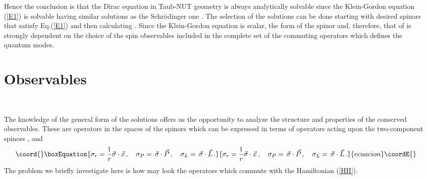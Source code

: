 \documentclass[a4paper,12pt]{article}
\begin{document}
Hence the  conclusion is that the Dirac equation in  Taub-NUT geometry  
is always analytically solvable since the Klein-Gordon equation (\ref{E1}) is 
solvable having similar solutions as the Schr\" odinger one \cite{CV}. The 
selection of the solutions can be done  starting with desired  
spinors \coordHE{} that satisfy Eq.(\ref{E1}) and then calculating 
\coordHE{}. Since the Klein-Gordon equation is scalar, the form of the 
spinor  \coordHE{} and, therefore, that of \coordHE{} is strongly dependent on 
the choice of the spin observables included in the complete set of the 
commuting operators which defines the quantum modes.    


\section{Observables}
\

The knowledge of the general form of the solutions  offers us the 
opportunity to analyze the structure and  properties of the 
conserved observables. These are operators in the spaces of the spinors 
\coordHE{} which can be expressed in terms  of operators acting upon the 
two-component spinors \cite{DYON}, \coordHE{} and 
\begin{equation}\coord{}\boxEquation{
\sigma_{r}=\frac{1}{r}\vec{\sigma}\cdot\vec{x}\,,\quad
\sigma_{P}=\,\vec{\sigma}\cdot\vec{P}\,,\quad
\sigma_{L}=\,\vec{\sigma}\cdot\vec{L}\,.
}{
\sigma_{r}=\frac{1}{r}\vec{\sigma}\cdot\vec{x}\,,\quad
\sigma_{P}=\,\vec{\sigma}\cdot\vec{P}\,,\quad
\sigma_{L}=\,\vec{\sigma}\cdot\vec{L}\,.
}{ecuacion}\coordE{}\end{equation}
The problem we briefly investigate here is how may look the 
operators which commute with the  Hamiltonian (\ref{HH}). 
\end{document}
